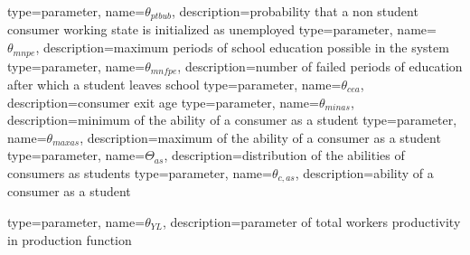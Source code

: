 

{%
  type=parameter,%
  name={$\theta_{ptbub}$},%
  description={probability that a non student consumer working state is initialized as unemployed} 
}
{%
  type=parameter,%
  name={$\theta_{mnpe}$},%
  description={maximum periods of school education possible in the system} 
}
{%
  type=parameter,%
  name={$\theta_{mnfpe}$},%
  description={number of failed periods of education after which a student leaves school} 
}
{%
  type=parameter,%
  name={$\theta_{cea}$},%
  description={consumer exit age} 
}
{%
  type=parameter,%
  name={$\theta_{minas}$},%
  description={minimum of the ability of a consumer as a student} 
}
{%
  type=parameter,%
  name={$\theta_{maxas}$},%
  description={maximum of the ability of a consumer as a student} 
}
{%
  type=parameter,%
  name={$\Theta_{as}$},%
  description={distribution of the abilities of consumers as students} 
}
{%
  type=parameter,%
  name={$\theta_{c,as}$},%
  description={ability of a consumer as a student} 
}
 
{%
  type=parameter,%
  name={$\theta_{YL}$},%
  description={parameter of total workers productivity in production function} 
}
 
